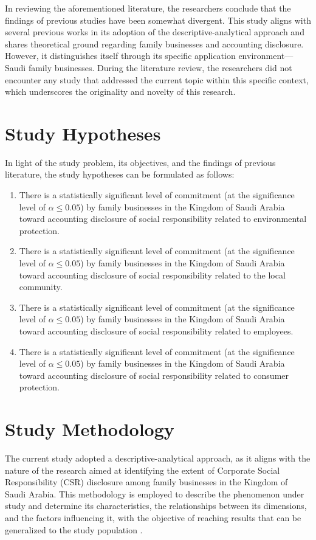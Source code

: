 \documentclass{NSP1}
\begin{document}
In reviewing the aforementioned literature, the researchers conclude that the findings of previous studies have been somewhat divergent. This study aligns with several previous works in its adoption of the descriptive-analytical approach and shares theoretical ground regarding family businesses and accounting disclosure. However, it distinguishes itself through its specific application environment---Saudi family businesses. During the literature review, the researchers did not encounter any study that addressed the current topic within this specific context, which underscores the originality and novelty of this research.

\section{Study Hypotheses}
In light of the study problem, its objectives, and the findings of previous literature, the study hypotheses can be formulated as follows:
\begin{enumerate}
\item There is a statistically significant level of commitment (at the significance level of $\alpha \le 0.05$) by family businesses in the Kingdom of Saudi Arabia toward accounting disclosure of social responsibility related to environmental protection.
\item There is a statistically significant level of commitment (at the significance level of $\alpha \le 0.05$) by family businesses in the Kingdom of Saudi Arabia toward accounting disclosure of social responsibility related to the local community.
\item There is a statistically significant level of commitment (at the significance level of $\alpha \le 0.05$) by family businesses in the Kingdom of Saudi Arabia toward accounting disclosure of social responsibility related to employees.
\item There is a statistically significant level of commitment (at the significance level of $\alpha \le 0.05$) by family businesses in the Kingdom of Saudi Arabia toward accounting disclosure of social responsibility related to consumer protection.
\end{enumerate}

\section{Study Methodology}
The current study adopted a descriptive-analytical approach, as it aligns with the nature of the research aimed at identifying the extent of Corporate Social Responsibility (CSR) disclosure among family businesses in the Kingdom of Saudi Arabia. This methodology is employed to describe the phenomenon under study and determine its characteristics, the relationships between its dimensions, and the factors influencing it, with the objective of reaching results that can be generalized to the study population \cite{ref32}.
\end{document}
